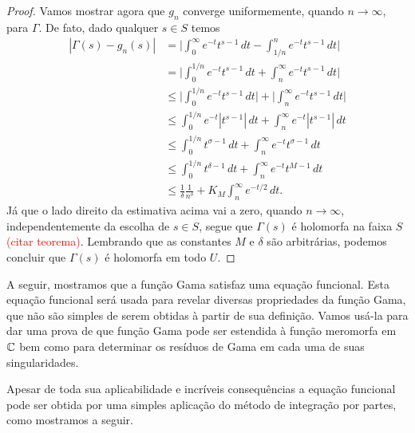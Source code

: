 \begin{proof}
    Vamos mostrar agora que $g_n$ converge uniformemente,
    quando $n\to\infty$, para $\Gamma$. De fato, dado qualquer
    $s\in S$ temos 
        \begin{align*}
            |\Gamma(s) - g_n(s)| &= \Big | \int_{0}^{\infty}e^{-t}t^{s-1} \, dt -  \int_{1/n}^{n}e^{-t}t^{s-1} \, dt \Big | \\
            & = \Big | \int_{0}^{1/n}e^{-t}t^{s-1} \, dt +  \int_{n}^{\infty}e^{-t}t^{s-1} \, dt \Big | \\
            &\leq \Big | \int_{0}^{1/n}e^{-t}t^{s-1} \, dt \Big | +  \Big | \int_{n}^{\infty}e^{-t}t^{s-1} \, dt \Big | \\
            &\leq \int_{0}^{1/n}e^{-t}|t^{s-1}| \, dt  + \int_{n}^{\infty}e^{-t}|t^{s-1}| \, dt \\
            &\leq \int_{0}^{1/n}t^{\sigma-1} \, dt + \int_{n}^{\infty}e^{-t}t^{\sigma-1} \, dt \\
            &\leq \int_{0}^{1/n}t^{\delta-1} \, dt + \int_{n}^{\infty}e^{-t}t^{M-1} \, dt \\
            &\leq \frac{1}{\delta}\frac{1}{n^\delta} + K_M\int_{n}^{\infty}e^{-t/2} \, dt.
        \end{align*}
        Já que o lado direito da estimativa acima vai a zero,
        quando $n\to\infty$, independentemente da escolha de $s\in S$, segue que $\Gamma(s)$ é holomorfa na faixa 
        $S$ \textcolor{red}{(citar teorema)}. 
        Lembrando que as constantes $M$ e $\delta$ são arbitrárias, 
        podemos concluir que $\Gamma(s)$ é holomorfa em todo $U$.
    \end{proof}
    
    
    \bigskip 
    
    A seguir, mostramos que a função Gama satisfaz uma equação funcional.
    Esta equação funcional será usada para revelar diversas propriedades 
    da função Gama, que não são simples de serem obtidas à partir 
    de sua definição.
    Vamos usá-la para dar uma prova de que função Gama pode ser estendida à 
    função meromorfa em $\mathbb{C}$ bem como para determinar os resíduos 
    de Gama em cada uma de suas singularidades.  
    
    
    Apesar de toda sua aplicabilidade e incríveis consequências a equação funcional pode ser obtida por uma simples aplicação do método de integração por partes, como mostramos a seguir. 
    
